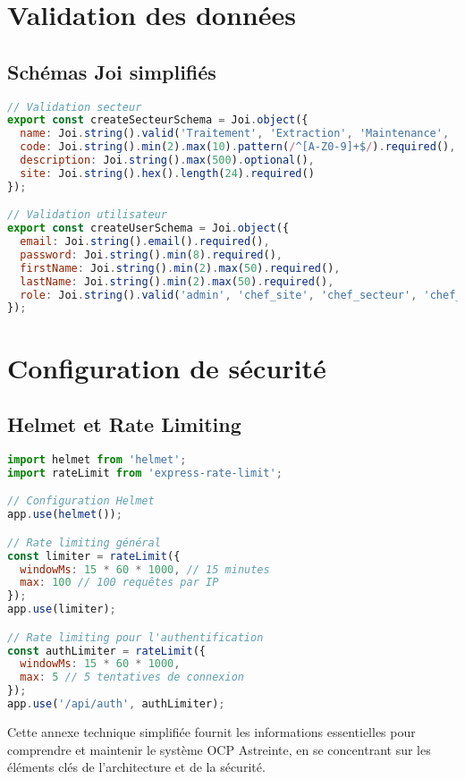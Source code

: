 \section{Validation des données}
\subsection{Schémas Joi simplifiés}
\begin{lstlisting}[language=JavaScript, caption=Validation simplifiée]
// Validation secteur
export const createSecteurSchema = Joi.object({
  name: Joi.string().valid('Traitement', 'Extraction', 'Maintenance', 'Logistique', 'Qualité').required(),
  code: Joi.string().min(2).max(10).pattern(/^[A-Z0-9]+$/).required(),
  description: Joi.string().max(500).optional(),
  site: Joi.string().hex().length(24).required()
});

// Validation utilisateur
export const createUserSchema = Joi.object({
  email: Joi.string().email().required(),
  password: Joi.string().min(8).required(),
  firstName: Joi.string().min(2).max(50).required(),
  lastName: Joi.string().min(2).max(50).required(),
  role: Joi.string().valid('admin', 'chef_site', 'chef_secteur', 'chef_service', 'ingenieur', 'collaborateur').required()
});
\end{lstlisting}

\section{Configuration de sécurité}
\subsection{Helmet et Rate Limiting}
\begin{lstlisting}[language=JavaScript, caption=Configuration de sécurité simplifiée]
import helmet from 'helmet';
import rateLimit from 'express-rate-limit';

// Configuration Helmet
app.use(helmet());

// Rate limiting général
const limiter = rateLimit({
  windowMs: 15 * 60 * 1000, // 15 minutes
  max: 100 // 100 requêtes par IP
});
app.use(limiter);

// Rate limiting pour l'authentification
const authLimiter = rateLimit({
  windowMs: 15 * 60 * 1000,
  max: 5 // 5 tentatives de connexion
});
app.use('/api/auth', authLimiter);
\end{lstlisting}

Cette annexe technique simplifiée fournit les informations essentielles pour comprendre et maintenir le système OCP Astreinte, en se concentrant sur les éléments clés de l'architecture et de la sécurité.
